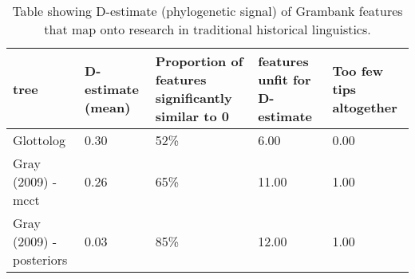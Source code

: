 \begin{table}[ht]
\centering
\begin{tabular}{p{6cm}p{2.2cm}p{2.2cm}p{2.2cm}p{2.2cm}}
  \hline
tree & D-estimate (mean) & Proportion of features significantly similar to 0 & features unfit for D-estimate & Too few tips altogether \\ 
  \hline
Glottolog & 0.30 & 52\% & 6.00 & 0.00 \\ 
  Gray (2009) - mcct & 0.26 & 65\% & 11.00 & 1.00 \\ 
  Gray (2009) - posteriors & 0.03 & 85\% & 12.00 & 1.00 \\ 
   \hline
\end{tabular}
\caption{Table showing D-estimate (phylogenetic signal) of Grambank features that map onto research in traditional historical linguistics.} 
\label{d_estimate_summary}
\end{table}
